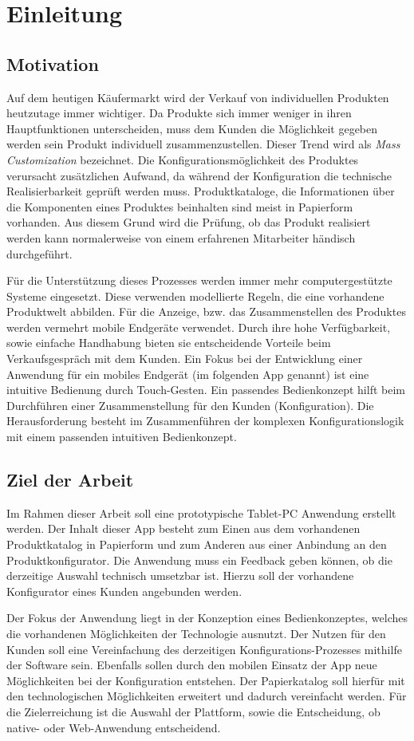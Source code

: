 \chapter{Einleitung}
\section{Motivation} \label{aufgaben}
Auf dem heutigen Käufermarkt wird der Verkauf von individuellen Produkten heutzutage immer wichtiger. Da Produkte sich immer weniger in ihren Hauptfunktionen unterscheiden, muss dem Kunden die Möglichkeit gegeben werden sein Produkt individuell zusammenzustellen. Dieser Trend wird als \textit{Mass Customization} \cite{bib:massCustomization} bezeichnet. Die Konfigurationsmöglichkeit des Produktes verursacht zusätzlichen Aufwand, da während der Konfiguration die technische Realisierbarkeit geprüft werden muss. Produktkataloge, die Informationen über die Komponenten eines Produktes beinhalten sind meist in Papierform vorhanden. Aus diesem Grund wird die Prüfung, ob das Produkt realisiert werden kann normalerweise von einem erfahrenen Mitarbeiter händisch durchgeführt.

\par Für die Unterstützung dieses Prozesses werden immer mehr computergestützte Systeme eingesetzt. Diese verwenden modellierte Regeln, die eine vorhandene Produktwelt abbilden. Für die Anzeige, bzw. das Zusammenstellen des Produktes werden vermehrt mobile Endgeräte verwendet. Durch ihre hohe Verfügbarkeit, sowie einfache Handhabung bieten sie entscheidende Vorteile beim Verkaufsgespräch mit dem Kunden. Ein Fokus bei der Entwicklung einer Anwendung für ein mobiles Endgerät (im folgenden App genannt) ist eine intuitive Bedienung durch Touch-Gesten.  Ein passendes Bedienkonzept hilft beim Durchführen einer Zusammenstellung für den Kunden (Konfiguration). Die Herausforderung besteht im Zusammenführen der komplexen Konfigurationslogik mit einem passenden intuitiven Bedienkonzept. 


\section{Ziel der Arbeit} \label{goal}
Im Rahmen dieser Arbeit soll eine prototypische Tablet-PC Anwendung erstellt werden. Der Inhalt dieser App besteht zum Einen aus dem vorhandenen Produktkatalog in Papierform und zum Anderen aus einer Anbindung an den Produktkonfigurator.  Die Anwendung muss ein Feedback geben können, ob die derzeitige Auswahl technisch umsetzbar ist. Hierzu soll der vorhandene Konfigurator eines Kunden angebunden werden.
\par
Der Fokus der Anwendung liegt in der Konzeption eines Bedienkonzeptes, welches die vorhandenen Möglichkeiten der Technologie ausnutzt. Der Nutzen für den Kunden soll eine Vereinfachung des derzeitigen Konfigurations-Prozesses mithilfe der Software sein. Ebenfalls sollen durch den mobilen Einsatz der App neue Möglichkeiten bei der Konfiguration entstehen. Der Papierkatalog soll hierfür mit den technologischen Möglichkeiten erweitert und dadurch vereinfacht werden. Für die Zielerreichung ist die  Auswahl der Plattform, sowie die Entscheidung, ob native- oder Web-Anwendung entscheidend. 


